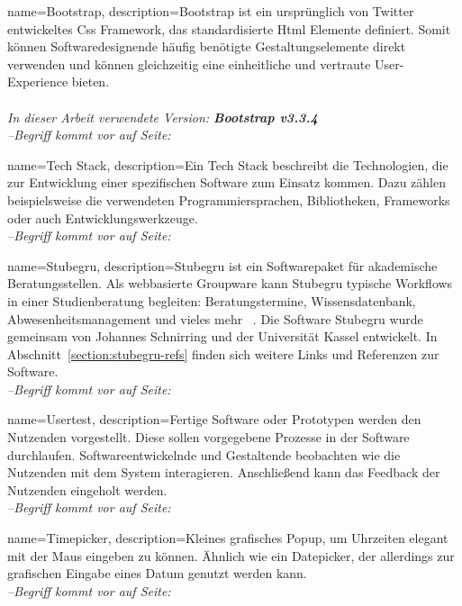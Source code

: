 \makeglossaries

{
    name=Bootstrap,
    description={Bootstrap ist ein ursprünglich von Twitter entwickeltes \gls{Css} Framework, das standardisierte \gls{Html} Elemente definiert. Somit können Softwaredesignende häufig benötigte Gestaltungselemente direkt verwenden und können gleichzeitig eine einheitliche und vertraute User-Experience bieten.\\ \\
            \textit{In dieser Arbeit verwendete Version: \textbf{Bootstrap v3.3.4}}
            ~\cite{Bootstrap}}
    \\\textit{--Begriff kommt vor auf Seite: }
}

{
    name=Tech Stack,
    description={Ein Tech Stack beschreibt die Technologien, die zur Entwicklung einer spezifischen Software zum Einsatz kommen. Dazu zählen beispielsweise die verwendeten Programmiersprachen, Bibliotheken, Frameworks oder auch Entwicklungswerkzeuge.}
    \\\textit{--Begriff kommt vor auf Seite: }
}

{
    name=Stubegru,
    description={Stubegru ist ein Softwarepaket für akademische Beratungsstellen. Als webbasierte Groupware kann Stubegru typische Workflows in einer Studienberatung begleiten: Beratungstermine, Wissensdatenbank, Abwesenheitsmanagement und vieles mehr
            ~\cite{stubegruWebsite}. Die Software Stubegru wurde gemeinsam von Johannes Schnirring und der Universität Kassel entwickelt. In Abschnitt~\ref{section:stubegru-refs} finden sich weitere Links und Referenzen zur Software.}
    \\\textit{--Begriff kommt vor auf Seite: }
}

{
    name=Usertest,
    description={Fertige Software oder Prototypen werden den Nutzenden vorgestellt. Diese sollen vorgegebene Prozesse in der Software durchlaufen. Softwareentwickelnde und Gestaltende beobachten wie die Nutzenden mit dem System interagieren. Anschließend kann das Feedback der Nutzenden eingeholt werden.}
    \\\textit{--Begriff kommt vor auf Seite: }
}

{
    name=Timepicker,
    description={Kleines grafisches Popup, um Uhrzeiten elegant mit der Maus eingeben zu können. Ähnlich wie ein Datepicker, der allerdings zur grafischen Eingabe eines Datum genutzt werden kann.
            ~\cite{datepicker}}
    \\\textit{--Begriff kommt vor auf Seite: }
}

